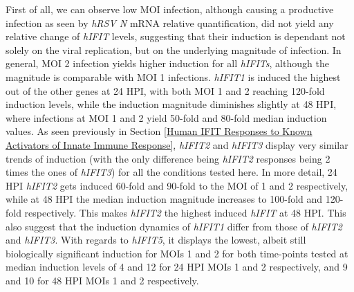 First of all, we can observe low MOI infection, although causing a productive infection as seen by \textit{hRSV N} mRNA relative quantification, did not yield any relative change of \textit{hIFIT} levels, suggesting that their induction is dependant not solely on the viral replication, but on the underlying magnitude of infection. In general, MOI 2 infection yields higher induction for all \textit{hIFITs}, although the magnitude is comparable with MOI 1 infections. \textit{hIFIT1} is induced the highest out of the other genes at 24 HPI, with both MOI 1 and 2 reaching 120-fold induction levels, while the induction magnitude diminishes slightly at 48 HPI, where infections at MOI 1 and 2 yield 50-fold and 80-fold median induction values. As seen previously in Section \ref{Human IFIT Responses to Known Activators of Innate Immune Response}, \textit{hIFIT2} and \textit{hIFIT3} display very similar trends of induction (with the only difference being \textit{hIFIT2} responses being 2 times the ones of \textit{hIFIT3}) for all the conditions tested here. In more detail, 24 HPI \textit{hIFIT2} gets induced 60-fold and 90-fold to the MOI of 1 and 2 respectively, while at 48 HPI the median induction magnitude increases to 100-fold and 120-fold respectively. This makes \textit{hIFIT2} the highest induced \textit{hIFIT} at 48 HPI. This also suggest that the induction dynamics of \textit{hIFIT1} differ from those of \textit{hIFIT2} and \textit{hIFIT3}. With regards to \textit{hIFIT5}, it displays the lowest, albeit still biologically significant induction for MOIs 1 and 2 for both time-points tested at median induction levels of 4 and 12 for 24 HPI MOIs 1 and 2 respectively, and 9 and 10 for 48 HPI MOIs 1 and 2 respectively. 


